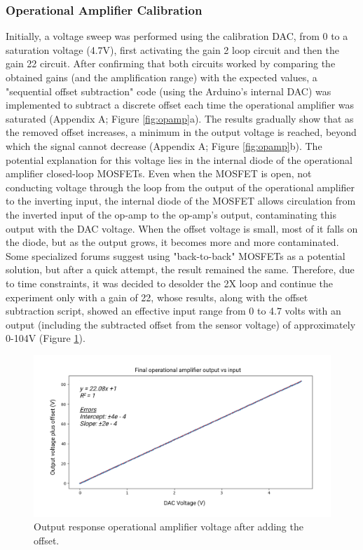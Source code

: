 \documentclass[conference]{IEEEtran}
\begin{document}
      \subsubsection{Operational Amplifier Calibration}
      Initially, a voltage sweep was performed using the calibration DAC, from 0 to a saturation voltage (4.7V), first activating the gain 2 loop circuit and then the gain 22 circuit.
       After confirming that both circuits worked by comparing the obtained gains (and the amplification range) with the expected values, a "sequential offset subtraction" code 
       (using the Arduino's internal DAC) was implemented to subtract a discrete offset each time the operational amplifier was saturated (Appendix A; Figure \ref{fig:opamp}a). The results gradually show that as the 
       removed offset increases, a minimum in the output voltage is reached, beyond which the signal cannot decrease (Appendix A; Figure \ref{fig:opamp}b). The potential explanation for this voltage lies in the internal
        diode of the operational amplifier closed-loop MOSFETs. Even when the MOSFET is open, not conducting voltage through the loop from the output of the operational amplifier 
        to the inverting input, the internal diode of the MOSFET allows circulation from the inverted input of the op-amp to the op-amp's output, contaminating this output with the DAC voltage. 
        When the offset voltage is small, most of it falls on the diode, but as the output grows, it becomes more and more contaminated. Some specialized forums suggest using "back-to-back" MOSFETs\cite{BackBackMOSFET} 
        as a potential solution, but after a quick attempt, the result remained the same. Therefore, due to time constraints, it was decided to desolder the 2X loop and continue the experiment only with a 
        gain of 22, whose results, along with the offset subtraction script, showed an effective input range from 0 to 4.7 volts with an output (including the subtracted offset from the sensor voltage) 
        of approximately 0-104V (Figure \ref{fig:finalop}).

        \begin{figure}[!th]
         \centering
         \includegraphics[width=1\linewidth]{images/finalop.png}
         \caption{Output response operational amplifier voltage after adding the offset.}
         \label{fig:finalop}
      \end{figure}
\end{document}
